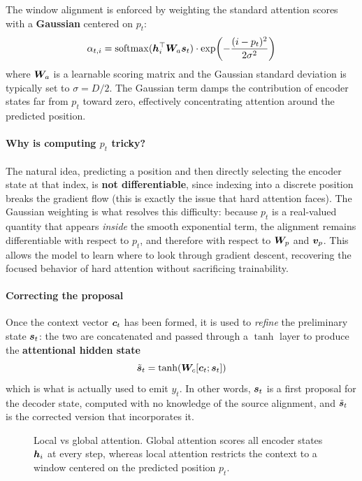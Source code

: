 The window alignment is enforced by weighting the standard attention scores with a \textbf{Gaussian} centered on $p_t$:
\[
\alpha_{t,i} = \operatorname{softmax}(\boldsymbol{h}_i^\top \boldsymbol{W}_a \boldsymbol{s}_t) \cdot \exp\!\left(-\frac{(i - p_t)^2}{2\sigma^2}\right)
\]
where $\boldsymbol{W}_a$ is a learnable scoring matrix and the Gaussian standard deviation is typically set to $\sigma = D/2$.
The Gaussian term damps the contribution of encoder states far from $p_t$ toward zero, effectively concentrating attention around the predicted position.

\paragraph{Why is computing $p_t$ tricky?}
The natural idea, predicting a position and then directly selecting the encoder state at that index, is \textbf{not differentiable}, since indexing into a discrete position breaks the gradient flow (this is exactly the issue that hard attention faces).
The Gaussian weighting is what resolves this difficulty: because $p_t$ is a real-valued quantity that appears \textit{inside} the smooth exponential term, the alignment remains differentiable with respect to $p_t$, and therefore with respect to $\boldsymbol{W}_p$ and $\boldsymbol{v}_p$.
This allows the model to learn where to look through gradient descent, recovering the focused behavior of hard attention without sacrificing trainability.

\paragraph{Correcting the proposal}
Once the context vector $\boldsymbol{c}_t$ has been formed, it is used to \textit{refine} the preliminary state $\boldsymbol{s}_t$: the two are concatenated and passed through a $\tanh$ layer to produce the \textbf{attentional hidden state}
\[
\tilde{\boldsymbol{s}}_t = \tanh\!\left(\boldsymbol{W}_c [\boldsymbol{c}_t; \boldsymbol{s}_t]\right)
\]
which is what is actually used to emit $y_t$. In other words, $\boldsymbol{s}_t$ is a first proposal for the decoder state, computed with no knowledge of the source alignment, and $\tilde{\boldsymbol{s}}_t$ is the corrected version that incorporates it.

\begin{figure}[H]
    \centering
    
    \caption{Local vs global attention. Global attention scores all encoder states $\boldsymbol{h}_i$ at every step, whereas local attention restricts the context to a window centered on the predicted position $p_t$.}
\end{figure}
